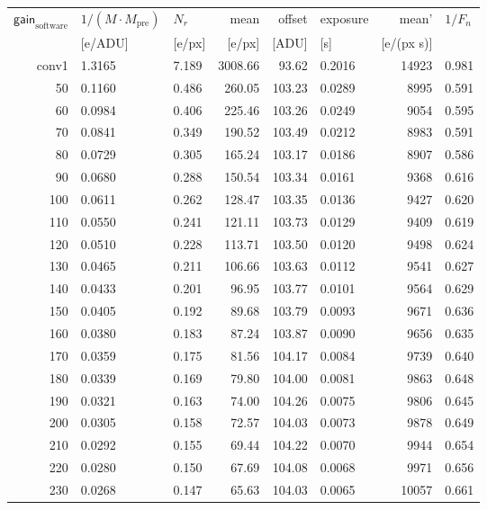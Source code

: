 \begin{table}[!htbp]
  \centering
  \begin{tabular}{r l l r r l r l}
\hline
$\textsf{gain}_\textrm{software}$ & $1/(M\cdot M_\textrm{pre})$ & $N_r$ & \textsf{mean} & \textsf{offset} & \textsf{exposure} & \textsf{mean'} & $1/F_n$ \\
 & [e/ADU] & [e/px] & [e/px] & [ADU] & [s] & [e/(px s)] & \\
\hline
conv1 & 1.3165 & 7.189 & 3008.66 & 93.62 & 0.2016 & 14923 & 0.981 \\
50 & 0.1160 & 0.486 & 260.05 & 103.23 & 0.0289 & 8995 & 0.591 \\
60 & 0.0984 & 0.406 & 225.46 & 103.26 & 0.0249 & 9054 & 0.595 \\
70 & 0.0841 & 0.349 & 190.52 & 103.49 & 0.0212 & 8983 & 0.591 \\
80 & 0.0729 & 0.305 & 165.24 & 103.17 & 0.0186 & 8907 & 0.586 \\
90 & 0.0680 & 0.288 & 150.54 & 103.34 & 0.0161 & 9368 & 0.616 \\
100 & 0.0611 & 0.262 & 128.47 & 103.35 & 0.0136 & 9427 & 0.620 \\
110 & 0.0550 & 0.241 & 121.11 & 103.73 & 0.0129 & 9409 & 0.619 \\
120 & 0.0510 & 0.228 & 113.71 & 103.50 & 0.0120 & 9498 & 0.624 \\
130 & 0.0465 & 0.211 & 106.66 & 103.63 & 0.0112 & 9541 & 0.627 \\
140 & 0.0433 & 0.201 & 96.95 & 103.77 & 0.0101 & 9564 & 0.629 \\
150 & 0.0405 & 0.192 & 89.68 & 103.79 & 0.0093 & 9671 & 0.636 \\
160 & 0.0380 & 0.183 & 87.24 & 103.87 & 0.0090 & 9656 & 0.635 \\
170 & 0.0359 & 0.175 & 81.56 & 104.17 & 0.0084 & 9739 & 0.640 \\
180 & 0.0339 & 0.169 & 79.80 & 104.00 & 0.0081 & 9863 & 0.648 \\
190 & 0.0321 & 0.163 & 74.00 & 104.26 & 0.0075 & 9806 & 0.645 \\
200 & 0.0305 & 0.158 & 72.57 & 104.03 & 0.0073 & 9878 & 0.649 \\
210 & 0.0292 & 0.155 & 69.44 & 104.22 & 0.0070 & 9944 & 0.654 \\
220 & 0.0280 & 0.150 & 67.69 & 104.08 & 0.0068 & 9971 & 0.656 \\
230 & 0.0268 & 0.147 & 65.63 & 104.03 & 0.0065 & 10057 & 0.661 \\

\end{tabular}
\end{table}
